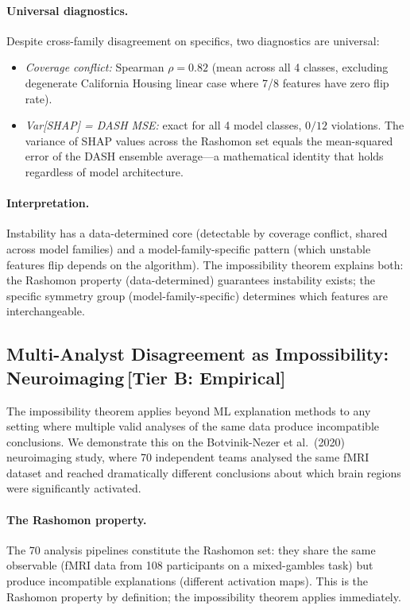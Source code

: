 \documentclass[11pt,a4paper]{article}
\begin{document}
\paragraph{Universal diagnostics.}
Despite cross-family disagreement on specifics, two diagnostics are universal:
\begin{itemize}
  \item \emph{Coverage conflict:} Spearman $\rho = 0.82$ (mean across all 4 classes, excluding degenerate California Housing linear case where 7/8 features have zero flip rate).
  \item \emph{Var[SHAP] = DASH MSE:} exact for all 4 model classes, $0/12$ violations.  The variance of SHAP values across the Rashomon set equals the mean-squared error of the DASH ensemble average---a mathematical identity that holds regardless of model architecture.
\end{itemize}

\paragraph{Interpretation.}
Instability has a data-determined core (detectable by coverage conflict, shared across model families) and a model-family-specific pattern (which unstable features flip depends on the algorithm).  The impossibility theorem explains both: the Rashomon property (data-determined) guarantees instability exists; the specific symmetry group (model-family-specific) determines which features are interchangeable.

\subsection{Multi-Analyst Disagreement as Impossibility: Neuroimaging\,\textnormal{\normalsize[Tier B: Empirical]}}
\label{sec:narps}

The impossibility theorem applies beyond ML explanation methods to any setting where multiple valid analyses of the same data produce incompatible conclusions.  We demonstrate this on the Botvinik-Nezer et al.\ (2020) neuroimaging study, where 70 independent teams analysed the same fMRI dataset and reached dramatically different conclusions about which brain regions were significantly activated.

\paragraph{The Rashomon property.}
The 70 analysis pipelines constitute the Rashomon set: they share the same observable (fMRI data from 108 participants on a mixed-gambles task) but produce incompatible explanations (different activation maps).  This is the Rashomon property by definition; the impossibility theorem applies immediately.
\end{document}
